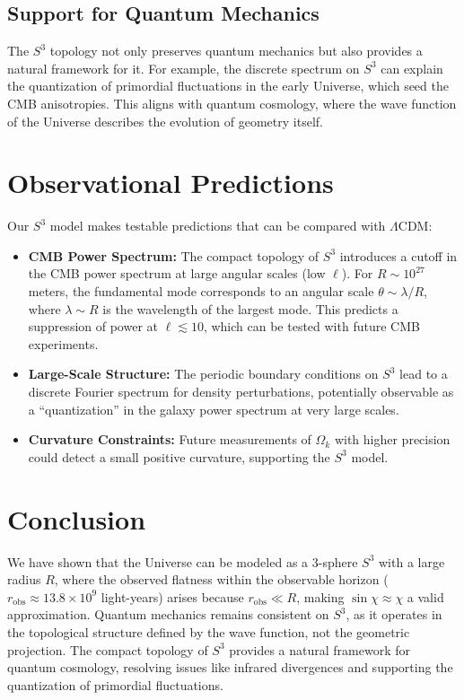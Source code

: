\documentclass[12pt]{article}
\begin{document}
\subsection{Support for Quantum Mechanics}

The \(S^3\) topology not only preserves quantum mechanics but also provides a natural framework for it. For example, the discrete spectrum on \(S^3\) can explain the quantization of primordial fluctuations in the early Universe, which seed the CMB anisotropies. This aligns with quantum cosmology, where the wave function of the Universe describes the evolution of geometry itself.

\section{Observational Predictions}

Our \(S^3\) model makes testable predictions that can be compared with \(\Lambda\)CDM:
\begin{itemize}
\item \textbf{CMB Power Spectrum:} The compact topology of \(S^3\) introduces a cutoff in the CMB power spectrum at large angular scales (low \(\ell\)). For \(R \sim 10^{27}\) meters, the fundamental mode corresponds to an angular scale \(\theta \sim \lambda/R\), where \(\lambda \sim R\) is the wavelength of the largest mode. This predicts a suppression of power at \(\ell \lesssim 10\), which can be tested with future CMB experiments.
\item \textbf{Large-Scale Structure:} The periodic boundary conditions on \(S^3\) lead to a discrete Fourier spectrum for density perturbations, potentially observable as a ``quantization'' in the galaxy power spectrum at very large scales.
\item \textbf{Curvature Constraints:} Future measurements of \(\Omega_k\) with higher precision could detect a small positive curvature, supporting the \(S^3\) model.
\end{itemize}

\section{Conclusion}

We have shown that the Universe can be modeled as a 3-sphere \(S^3\) with a large radius \(R\), where the observed flatness within the observable horizon (\(r_{\mathrm{obs}} \approx 13.8 \times 10^9\) light-years) arises because \(r_{\mathrm{obs}} \ll R\), making \(\sin\chi \approx \chi\) a valid approximation. Quantum mechanics remains consistent on \(S^3\), as it operates in the topological structure defined by the wave function, not the geometric projection. The compact topology of \(S^3\) provides a natural framework for quantum cosmology, resolving issues like infrared divergences and supporting the quantization of primordial fluctuations.
\end{document}
